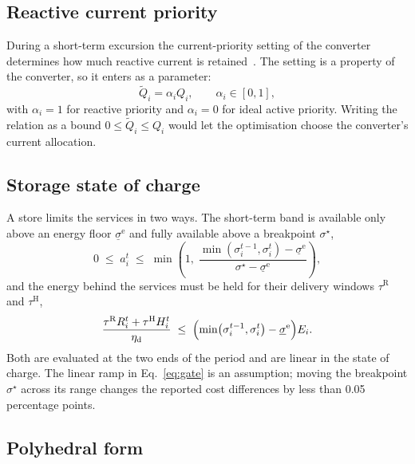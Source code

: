 \subsection{Reactive current priority}

During a short-term excursion the current-priority setting of the converter
determines how much reactive current is
retained~\cite{qoria2020current,bottrell2014comparison}. The setting is a
property of the converter, so it enters as a parameter:
%
\begin{equation}
  \tilde{Q}_i = \alpha_i Q_i , \qquad \alpha_i \in [0,1] ,
  \label{eq:priority}
\end{equation}
%
with $\alpha_i = 1$ for reactive priority and $\alpha_i = 0$ for ideal active
priority. Writing the relation as a bound $0 \le \tilde{Q}_i \le Q_i$ would
let the optimisation choose the converter's current allocation.

\subsection{Storage state of charge}

A store limits the services in two ways. The short-term band is available
only above an energy floor $\underline{\sigma}^{\mathrm{e}}$ and fully
available above a breakpoint $\sigma^{\star}$,
%
\begin{equation}
  0 \;\le\; a_i^t \;\le\; \min\!\left(1, \;
    \frac{\min\!\left(\sigma_i^{t-1}, \sigma_i^{t}\right)
      - \underline{\sigma}^{\mathrm{e}}}
    {\sigma^{\star} - \underline{\sigma}^{\mathrm{e}}}\right) ,
  \label{eq:gate}
\end{equation}
%
and the energy behind the services must be held for their delivery windows
$\tau^{\mathrm{R}}$ and $\tau^{\mathrm{H}}$,
%
\begin{equation}
  \frac{\tau^{\mathrm{R}} R_i^t + \tau^{\mathrm{H}} H_i^t}{\eta_{\mathrm{d}}}
    \;\le\; \Bigl( \min\!\left(\sigma_i^{t-1}, \sigma_i^{t}\right)
      - \underline{\sigma}^{\mathrm{e}} \Bigr) E_i .
  \label{eq:deliverability}
\end{equation}
%
Both are evaluated at the two ends of the period and are linear in the state
of charge. The linear ramp in Eq.~\eqref{eq:gate} is an assumption; moving the
breakpoint $\sigma^{\star}$ across its range changes the reported cost
differences by less than \num{0.05} percentage points.

\subsection{Polyhedral form}
\label{sec:polygon-error}

